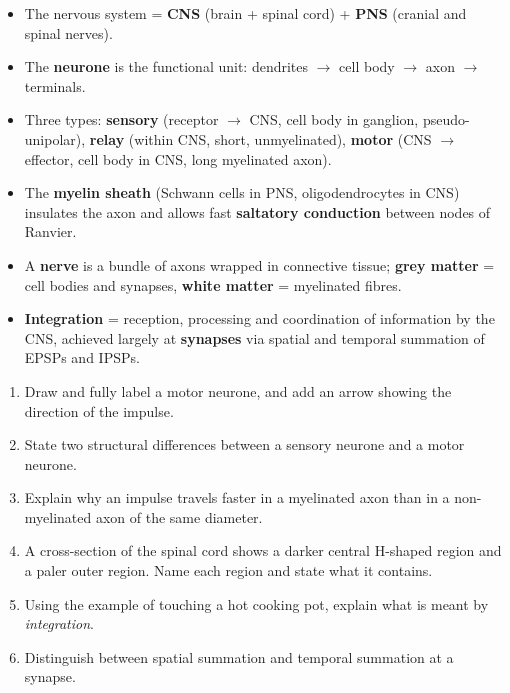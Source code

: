 \documentclass[11pt]{article}
\begin{document}
\begin{aretenir}
\begin{itemize}
\item The nervous system = \textbf{CNS} (brain + spinal cord) + \textbf{PNS} (cranial and spinal nerves).
\item The \textbf{neurone} is the functional unit: dendrites $\rightarrow$ cell body $\rightarrow$ axon $\rightarrow$ terminals.
\item Three types: \textbf{sensory} (receptor $\rightarrow$ CNS, cell body in ganglion, pseudo-unipolar), \textbf{relay} (within CNS, short, unmyelinated), \textbf{motor} (CNS $\rightarrow$ effector, cell body in CNS, long myelinated axon).
\item The \textbf{myelin sheath} (Schwann cells in PNS, oligodendrocytes in CNS) insulates the axon and allows fast \textbf{saltatory conduction} between nodes of Ranvier.
\item A \textbf{nerve} is a bundle of axons wrapped in connective tissue; \textbf{grey matter} = cell bodies and synapses, \textbf{white matter} = myelinated fibres.
\item \textbf{Integration} = reception, processing and coordination of information by the CNS, achieved largely at \textbf{synapses} via spatial and temporal summation of EPSPs and IPSPs.
\end{itemize}
\end{aretenir}

\begin{exercice}
\begin{enumerate}
\item Draw and fully label a motor neurone, and add an arrow showing the direction of the impulse.
\item State two structural differences between a sensory neurone and a motor neurone.
\item Explain why an impulse travels faster in a myelinated axon than in a non-myelinated axon of the same diameter.
\item A cross-section of the spinal cord shows a darker central H-shaped region and a paler outer region. Name each region and state what it contains.
\item Using the example of touching a hot cooking pot, explain what is meant by \emph{integration}.
\item Distinguish between spatial summation and temporal summation at a synapse.
\end{enumerate}
\end{exercice}
\end{document}
